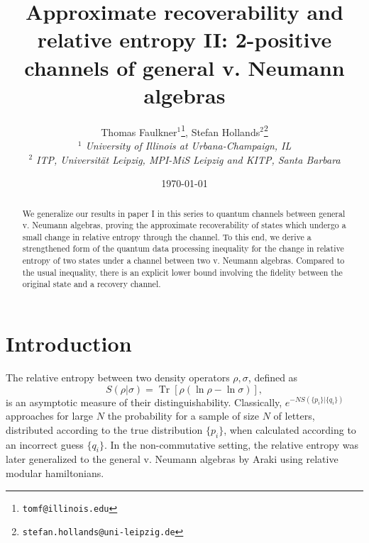 \documentclass[english,a4paper,12pt]{article}
\newcommand{\ben}{\begin{equation}}
\newcommand{\een}{\end{equation}}
\newcommand{\tr}{\operatorname{Tr}}
\renewcommand{\log}{\operatorname{ln}}
\begin{document}
\title{Approximate recoverability and relative entropy II: 
2-positive channels of general v. Neumann algebras
}


	\author{Thomas Faulkner$^{1}$\thanks{\tt\tt tomf@illinois.edu}, Stefan Hollands$^{2}$\thanks{\tt stefan.hollands@uni-leipzig.de}\\
	{\it $^1$ University of Illinois at Urbana-Champaign, IL}\\
	{\it $^2$ ITP, Universit\" at Leipzig, MPI-MiS Leipzig and KITP, Santa Barbara}
	}

\date{\today}
	
\maketitle

	
\begin{abstract}
We generalize our results in paper I in this series to quantum channels between general v. Neumann algebras, 
proving the approximate recoverability of states which undergo a small change in 
relative entropy through the channel. 
To this end, we derive a strengthened form of the quantum data processing inequality for the change in 
relative entropy of two states under a channel between two v. Neumann algebras.
Compared to the usual inequality, there is an explicit lower bound involving the fidelity 
between the original state and a 
recovery channel.
\end{abstract}

\section{Introduction}

The relative entropy between two density operators $\rho, \sigma$, defined as 
\ben\label{eq:Srel}
S(\rho| \sigma) = \tr[\rho (\log \rho - \log \sigma)], 
\een
is an asymptotic measure of their distinguishability. Classically, $e^{-NS(\{p_i\} | \{q_i\})}$ approaches for large $N$ 
the probability for a sample of size $N$ of letters, distributed according to the 
true distribution $\{p_i\}$, when calculated according to an incorrect guess $\{q_i\}$. In the non-commutative setting, the relative entropy was later generalized to the 
general v. Neumann algebras by Araki \cite{Araki1,Araki2} using relative modular hamiltonians. 
\end{document}
